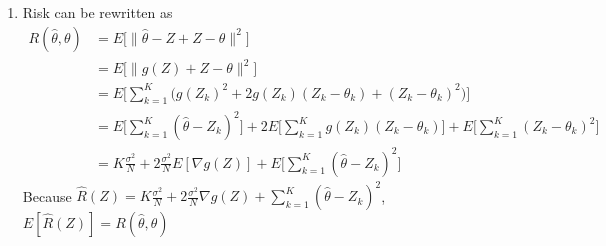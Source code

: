 \documentclass{article}[12pt]
\begin{document}
\begin{enumerate}
    \item Risk can be rewritten as
    \begin{align*}
        R(\hat{\theta}, \theta) &= E \bigg[ \| \hat{\theta} - Z + Z - \theta \|^2 \bigg] \\
        &= E \bigg[ \| g(Z) + Z - \theta \|^2 \bigg] \\
        &= E \bigg[ \sum_{k=1}^K \bigg( g(Z_k)^2 + 2 g(Z_k)(Z_k-\theta_k) + (Z_k - \theta_k)^2 \bigg) \bigg] \\
        &= E \bigg[ \sum_{k=1}^K (\hat{\theta}-Z_k)^2 \bigg] + 2E \bigg[ \sum_{k=1}^K g(Z_k)(Z_k-\theta_k) \bigg] + E \bigg[ \sum_{k=1}^K (Z_k - \theta_k)^2 \bigg] \\
        &= K \frac{\sigma^2}{N} + 2 \frac{\sigma^2}{N}E [\nabla g(Z)] + E \bigg[ \sum_{k=1}^K (\hat{\theta}-Z_k)^2 \bigg]
    \end{align*}
    Because $\hat{R}(Z) = K \frac{\sigma^2}{N} + 2 \frac{\sigma^2}{N} \nabla g(Z) + \sum_{k=1}^K (\hat{\theta}-Z_k)^2$, $E[\hat{R}(Z)] = R(\hat{\theta}, \theta)$


\end{enumerate}
\end{document}
